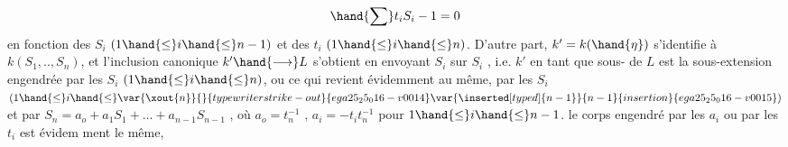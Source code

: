 \[ \hand{\sum} t_iS_i - 1 = 0 \]
en fonction des $S_i$ $(1\hand{\leq} i\hand{\leq} n-1)$ et des $t_i$ $(1\hand{\leq} i\hand{\leq} n)$. D'autre part,
$k' = k(\hand{\eta})$ s'identifie à $k(S_1,..,S_n)$, et l'inclusion canonique
$k'\hand{\longrightarrow} L$ s'obtient en envoyant $S_i$ sur $S_i$ , i.e. $k'$ en tant que sous-%
 de $L$ est la sous-extension engendrée par les $S_i$ $(1\hand{\leq} i\hand{\leq} n)$, ou
ce qui revient évidemment au même, par les $S_i$ $(1\hand{\leq} i\hand{\leq} \var{\xout{n}}{}{typewriter strike-out}{ega25_25_016-v0014}\var{\inserted[typed]{n-1}}{n-1}{insertion}{ega25_25_016-v0015})$ et par
$S_n = a_o + a_1S_1 + \ldots + a_{n-1}S_{n-1}$ , où $a_o = t_n^{-1}$ , $a_i =-t_it_n^{-1}$ pour
$1\hand{\leq} i\hand{\leq} n-1$.  le corps engendré par les $a_i$ ou par les $t_i$ est évidem
ment le même, 

